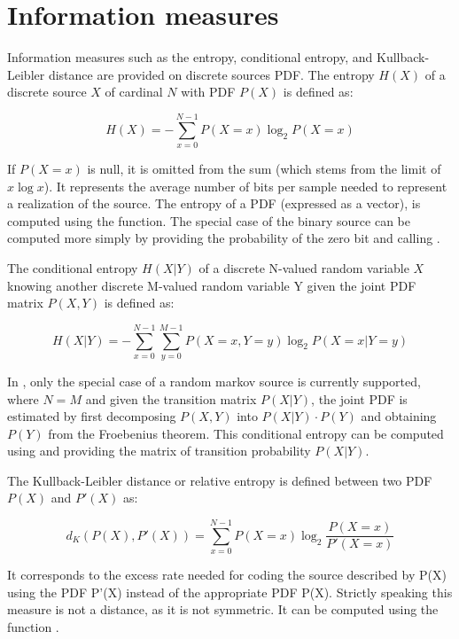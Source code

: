\section{Information measures}

    Information measures such as the entropy, conditional entropy, and
    Kullback-Leibler distance are provided on discrete sources
    PDF. The entropy $H(X)$ of a discrete source $X$ of cardinal $N$ with
    PDF $P(X)$ is defined as:

$$H(X) = -\sum\limits_{x=0}^{N-1} P(X=x) \log_2 P(X=x)$$

    If $P(X=x)$ is null, it is omitted from the sum (which stems from
    the limit of $x \log x$). It represents the average number of bits
    per sample needed to represent a realization of the source. The
    entropy of a PDF (expressed as a vector), is computed using the
     function. The special case of the
    binary source can be computed more simply by providing the
    probability of the zero bit and calling .

    The conditional entropy $H(X|Y)$ of a discrete N-valued random
    variable $X$ knowing another discrete M-valued random variable Y
    given the joint PDF matrix $P(X,Y)$ is defined as:

$$
H(X|Y) = -\sum\limits_{x=0}^{N-1}\sum\limits_{y=0}^{M-1} P(X=x,Y=y) \log_2 P(X=x|Y=y)
$$

    In \libit, only the special case of a random markov source is
    currently supported, where $N=M$ and given the transition matrix
    $P(X|Y)$, the joint PDF is estimated by first decomposing $P(X,Y)$
    into $P(X|Y) \cdot P(Y)$ and obtaining $P(Y)$ from the Froebenius
    theorem. This conditional entropy can be computed using 
     and providing
    the matrix of transition probability $P(X|Y)$.

    The Kullback-Leibler distance or relative entropy is defined
    between two PDF $P(X)$ and $P'(X)$ as:

$$d_K(P(X),P'(X)) = \sum\limits_{x=0}^{N-1} P(X=x) \log_2 \frac{P(X=x)}{P'(X=x)}$$

    It corresponds to the excess rate needed for coding the source
    described by P(X) using the PDF P'(X) instead of the appropriate
    PDF P(X). Strictly speaking this measure is not a distance, as it
    is not symmetric. It can be computed using the function 
    .


